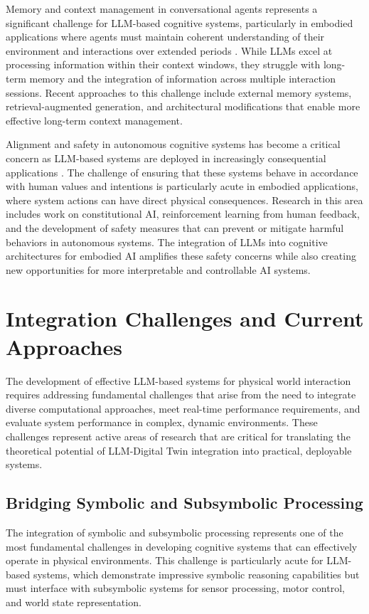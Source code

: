 Memory and context management in conversational agents represents a significant challenge for LLM-based cognitive systems, particularly in embodied applications where agents must maintain coherent understanding of their environment and interactions over extended periods \cite{wu2023survey}. While LLMs excel at processing information within their context windows, they struggle with long-term memory and the integration of information across multiple interaction sessions. Recent approaches to this challenge include external memory systems, retrieval-augmented generation, and architectural modifications that enable more effective long-term context management.

Alignment and safety in autonomous cognitive systems has become a critical concern as LLM-based systems are deployed in increasingly consequential applications \cite{hendrycks2023overview}. The challenge of ensuring that these systems behave in accordance with human values and intentions is particularly acute in embodied applications, where system actions can have direct physical consequences. Research in this area includes work on constitutional AI, reinforcement learning from human feedback, and the development of safety measures that can prevent or mitigate harmful behaviors in autonomous systems. The integration of LLMs into cognitive architectures for embodied AI amplifies these safety concerns while also creating new opportunities for more interpretable and controllable AI systems.

\section{Integration Challenges and Current Approaches}

The development of effective LLM-based systems for physical world interaction requires addressing fundamental challenges that arise from the need to integrate diverse computational approaches, meet real-time performance requirements, and evaluate system performance in complex, dynamic environments. These challenges represent active areas of research that are critical for translating the theoretical potential of LLM-Digital Twin integration into practical, deployable systems.

\subsection{Bridging Symbolic and Subsymbolic Processing}

The integration of symbolic and subsymbolic processing represents one of the most fundamental challenges in developing cognitive systems that can effectively operate in physical environments. This challenge is particularly acute for LLM-based systems, which demonstrate impressive symbolic reasoning capabilities but must interface with subsymbolic systems for sensor processing, motor control, and world state representation.

